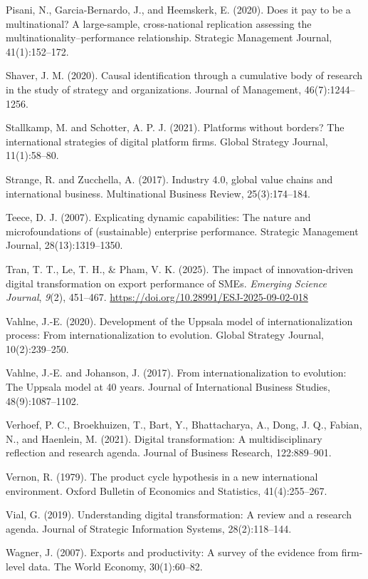 \documentclass[12pt,a4paper]{article}
\begin{document}
Pisani, N., Garcia-Bernardo, J., and Heemskerk, E. (2020). Does it pay
to be a multinational? A large-sample, cross-national replication
assessing the multinationality--performance relationship. Strategic
Management Journal, 41(1):152--172.

Shaver, J. M. (2020). Causal identification through a cumulative body of
research in the study of strategy and organizations. Journal of
Management, 46(7):1244--1256.

Stallkamp, M. and Schotter, A. P. J. (2021). Platforms without borders?
The international strategies of digital platform firms. Global Strategy
Journal, 11(1):58--80.

Strange, R. and Zucchella, A. (2017). Industry 4.0, global value chains
and international business. Multinational Business Review,
25(3):174--184.

Teece, D. J. (2007). Explicating dynamic capabilities: The nature and
microfoundations of (sustainable) enterprise performance. Strategic
Management Journal, 28(13):1319--1350.

Tran, T. T., Le, T. H., \& Pham, V. K. (2025). The impact of
innovation-driven digital transformation on export performance of SMEs.
\emph{Emerging Science Journal}, \emph{9}(2), 451--467.
\url{https://doi.org/10.28991/ESJ-2025-09-02-018}

Vahlne, J.-E. (2020). Development of the Uppsala model of
internationalization process: From internationalization to evolution.
Global Strategy Journal, 10(2):239--250.

Vahlne, J.-E. and Johanson, J. (2017). From internationalization to
evolution: The Uppsala model at 40 years. Journal of International
Business Studies, 48(9):1087--1102.

Verhoef, P. C., Broekhuizen, T., Bart, Y., Bhattacharya, A., Dong, J.
Q., Fabian, N., and Haenlein, M. (2021). Digital transformation: A
multidisciplinary reflection and research agenda. Journal of Business
Research, 122:889--901.

Vernon, R. (1979). The product cycle hypothesis in a new international
environment. Oxford Bulletin of Economics and Statistics,
41(4):255--267.

Vial, G. (2019). Understanding digital transformation: A review and a
research agenda. Journal of Strategic Information Systems,
28(2):118--144.

Wagner, J. (2007). Exports and productivity: A survey of the evidence
from firm-level data. The World Economy, 30(1):60--82.
\end{document}
